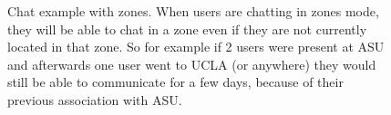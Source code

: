 \begin{figure}
\caption{Chat example with zones.  When users are chatting in zones mode, they will be able to chat in a zone even if they are not currently located in that zone. So for example if 2 users were present at ASU and afterwards one user went to UCLA  (or anywhere) they would still be able to communicate for a few days, because of their previous association with ASU.  }
\label{zones}
\end{figure}

